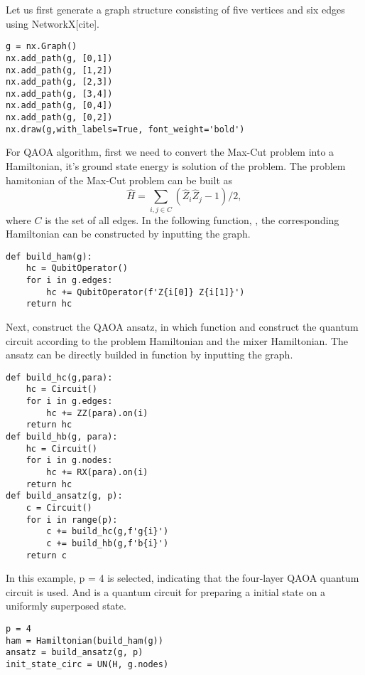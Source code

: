 Let us first generate a graph structure consisting of five vertices and six edges using NetworkX[cite].
\begin{lstlisting}
g = nx.Graph()
nx.add_path(g, [0,1])
nx.add_path(g, [1,2])
nx.add_path(g, [2,3])
nx.add_path(g, [3,4])
nx.add_path(g, [0,4])
nx.add_path(g, [0,2])
nx.draw(g,with_labels=True, font_weight='bold')
\end{lstlisting}

For QAOA algorithm, first we need to convert the Max-Cut problem into a Hamiltonian, it's ground state energy is solution of the problem. The problem hamitonian of the Max-Cut problem can be built as
\begin{equation}
    \hat{H} = \sum_{i,j\in C}(\hat{Z}_i\hat{Z}_j-1)/2,
\end{equation}
where $C$ is the set of all edges. In the following function, , the corresponding Hamiltonian can be constructed by inputting the graph.
\begin{lstlisting}
def build_ham(g):
    hc = QubitOperator()
    for i in g.edges:
        hc += QubitOperator(f'Z{i[0]} Z{i[1]}')
    return hc
\end{lstlisting}
Next, construct the QAOA ansatz, in which function  and  construct the quantum circuit according to the problem Hamiltonian and the mixer Hamiltonian. The ansatz can be directly builded in function  by inputting the graph.

\begin{lstlisting}
def build_hc(g,para):
    hc = Circuit()
    for i in g.edges:
        hc += ZZ(para).on(i)
    return hc
def build_hb(g, para):
    hc = Circuit()
    for i in g.nodes:
        hc += RX(para).on(i)
    return hc
def build_ansatz(g, p):
    c = Circuit()
    for i in range(p):
        c += build_hc(g,f'g{i}')
        c += build_hb(g,f'b{i}')
    return c
\end{lstlisting}

In this example, p = 4 is selected, indicating that the four-layer QAOA quantum circuit is used.  And  is a quantum circuit for preparing a initial state on a uniformly superposed state.
\begin{lstlisting}
p = 4
ham = Hamiltonian(build_ham(g))
ansatz = build_ansatz(g, p)
init_state_circ = UN(H, g.nodes)
\end{lstlisting}

